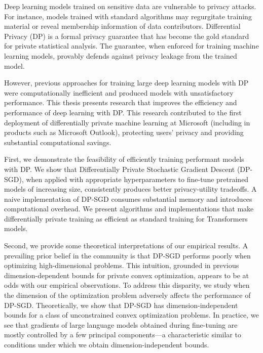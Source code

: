 
Deep learning models trained on sensitive data are vulnerable to privacy attacks.
For instance, models trained with standard algorithms may regurgitate training material or reveal membership information of data contributors.
Differential Privacy (DP) is a formal privacy guarantee that has become the gold standard for private statistical analysis.
The guarantee, when enforced for training machine learning models, provably defends against privacy leakage from the trained model.

However, previous approaches for training large deep learning models with DP were computationally inefficient and produced models with unsatisfactory performance. 
This thesis presents research that improves the efficiency and performance of deep learning with DP.
This research contributed to the first deployment of differentially private machine learning at Microsoft (including in products such as Microsoft Outlook), protecting users' privacy and providing substantial computational savings.

First, we demonstrate the feasibility of efficiently training performant models with DP. 
We show that Differentially Private Stochastic Gradient Descent (DP-SGD), when applied with appropriate hyperparameters to fine-tune pretrained models of increasing size, consistently produces better privacy-utility tradeoffs. A naive implementation of DP-SGD consumes substantial memory and introduces computational overhead. We present algorithms and implementations that make differentially private training as efficient as standard training for Transformers models.

Second, we provide some theoretical interpretations of our empirical results.
A prevailing prior belief in the community is that DP-SGD performs poorly when optimizing high-dimensional problems. This intuition, grounded in previous dimension-dependent bounds for private convex optimization, appears to be at odds with our empirical observations. To address this disparity, we study when the dimension of the optimization problem adversely affects the performance of DP-SGD. Theoretically, we show that DP-SGD has dimension-independent bounds for a class of unconstrained convex optimization problems. 
In practice, we see that gradients of large language models obtained during fine-tuning are mostly controlled by a few principal components---a characteristic similar to conditions under which we obtain dimension-independent bounds.
